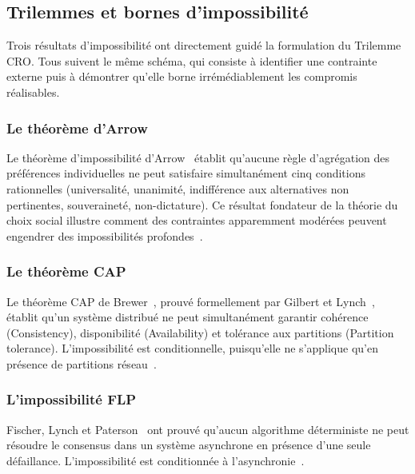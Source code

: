 \subsection{Trilemmes et bornes d'impossibilit\'e}
\label{subsec:trilemmes}
\begin{sloppypar}
Trois r\'esultats
d'impossibilit\'e ont directement guid\'e la formulation du Trilemme CRO. Tous suivent
le m\^eme sch\'ema, qui consiste \`a identifier une contrainte externe puis \`a d\'emontrer
qu'elle borne irr\'em\'ediablement les compromis r\'ealisables.

\subsubsection{Le th\'eor\`eme d'Arrow}
\label{subsubsec:arrow}

Le th\'eor\`eme d'impossibilit\'e d'Arrow~\cite{Arrow50} \'etablit qu'aucune r\`egle
d'agr\'egation des pr\'ef\'erences individuelles ne peut satisfaire simultan\'ement
cinq conditions rationnelles (universalit\'e, unanimit\'e, indiff\'erence aux
alternatives non pertinentes, souverainet\'e, non-dictature). Ce r\'esultat
fondateur de la th\'eorie du choix social illustre comment des contraintes
apparemment mod\'er\'ees peuvent engendrer des impossibilit\'es profondes~\cite{Sen}.

\subsubsection{Le th\'eor\`eme CAP}
\label{subsubsec:cap}

Le th\'eor\`eme CAP de Brewer~\cite{Brewer00}, prouv\'e formellement par Gilbert
et Lynch~\cite{GilbertLynch02}, \'etablit qu'un syst\`eme distribu\'e ne peut
simultan\'ement garantir coh\'erence (Consistency), disponibilit\'e (Availability)
et tol\'erance aux partitions (Partition tolerance). L'impossibilit\'e est
conditionnelle, puisqu'elle ne s'applique qu'en pr\'esence de partitions r\'eseau~\cite{ChandraHadzilacos96}.

\subsubsection{L'impossibilit\'e FLP}
\label{subsubsec:flp}

Fischer, Lynch et Paterson~\cite{FLP85} ont prouv\'e qu'aucun algorithme
d\'eterministe ne peut r\'esoudre le consensus dans un syst\`eme asynchrone en
pr\'esence d'une seule d\'efaillance. L'impossibilit\'e est conditionn\'ee \`a l'asynchronie~\cite{BenOr83,DebratMerz2012}.


\end{sloppypar}
